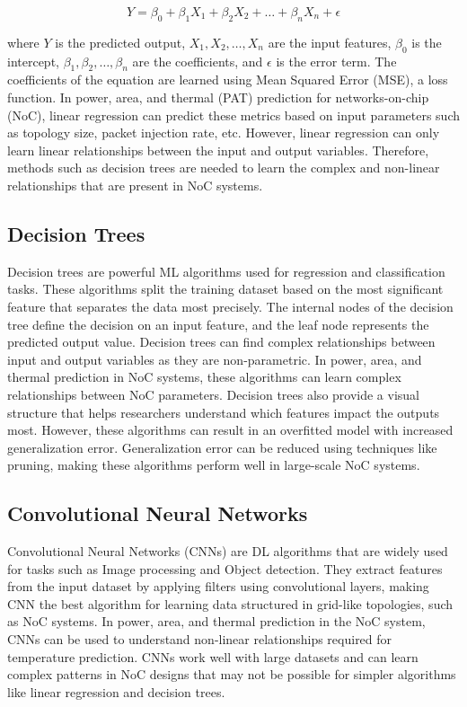 \documentclass[conference]{IEEEtran}
\begin{document}
\[
Y = \beta_0 + \beta_1 X_1 + \beta_2 X_2 + \dots + \beta_n X_n + \epsilon
\]

where \( Y \) is the predicted output, \( X_1, X_2, \dots, X_n \) are the input features, \( \beta_0 \) is the intercept, \( \beta_1, \beta_2, \dots, \beta_n \) are the coefficients, and \( \epsilon \) is the error term. The coefficients of the equation are learned using Mean Squared Error (MSE), a loss function. In power, area, and thermal (PAT) prediction for networks-on-chip (NoC), linear regression can predict these metrics based on input parameters such as topology size, packet injection rate, etc. However, linear regression can only learn linear relationships between the input and output variables. Therefore, methods such as decision trees are needed to learn the complex and non-linear relationships that are present in NoC systems.

\subsection{Decision Trees}

Decision trees are powerful ML algorithms used for regression and classification tasks. These algorithms split the training dataset based on the most significant feature that separates the data most precisely. The internal nodes of the decision tree define the decision on an input feature, and the leaf node represents the predicted output value. Decision trees can find complex relationships between input and output variables as they are non-parametric. In power, area, and thermal prediction in NoC systems, these algorithms can learn complex relationships between NoC parameters. Decision trees also provide a visual structure that helps researchers understand which features impact the outputs most. However, these algorithms can result in an overfitted model with  increased generalization error. Generalization error can be reduced using techniques like pruning, making these algorithms perform well in large-scale NoC systems.

\subsection{Convolutional Neural Networks}

Convolutional Neural Networks (CNNs) are DL algorithms that are widely used for tasks such as Image processing and Object detection. They extract features from the input dataset by applying filters using convolutional layers, making CNN the best algorithm for learning data structured in grid-like topologies, such as NoC systems. In power, area, and thermal prediction in the NoC system, CNNs can be used to understand non-linear relationships required for temperature prediction. CNNs work well with large datasets and can learn complex patterns in NoC designs that may not be possible for simpler algorithms like linear regression and decision trees.
\end{document}
